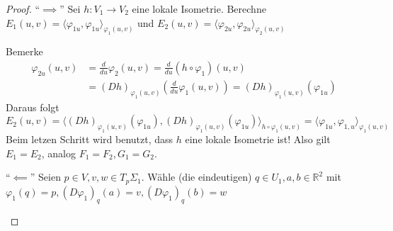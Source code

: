 \documentclass[../main.tex]{subfiles}
\begin{document}
\begin{proof}
    ``$\implies$'' Sei $h:V_1 \to V_2$ eine lokale Isometrie.
    Berechne $E_1(u,v)=\langle \varphi_{1u}, \varphi_{1u} \rangle _{\varphi_1(u,v)}$ und
    $E_2(u,v)=\langle \varphi_{2u}, \varphi_{2u} \rangle _{\varphi_2(u,v)}$

    Bemerke
    \begin{align*}
        \varphi_{2u}(u,v)&=\frac{d}{du}\varphi_2(u,v)=\frac{d}{du}(h \circ \varphi_1)(u,v) \\
        &=(Dh)_{\varphi_1(u,v)}\left(\frac{d}{du}\varphi_1(u,v)\right)=(Dh)_{\varphi_1(u,v)}(\varphi_{1u})
    \end{align*}
    Daraus folgt
    $$E_2(u,v)=\langle (Dh)_{\varphi_1(u,v)}(\varphi_{1u}), (Dh)_{\varphi_1(u,v)}(\varphi_{1u}) \rangle _{h \circ \varphi_1(u,v)}= \langle \varphi_{1u}, \varphi_{1,u}\rangle _{\varphi_1(u,v)}$$
    Beim letzen Schritt wird benutzt, dass $h$ eine lokale Isometrie ist! Also gilt $E_1=E_2$, analog $F_1=F_2, G_1=G_2$.

    \noindent``$\impliedby$'' Seien $p \in V, v,w \in T_p\Sigma_1$.
    Wähle (die eindeutigen) $q \in U_1, a,b \in \mathbb{R}^2$ mit 
    $\varphi_1 (q)=p, (D\varphi_1)_q(a)=v, (D\varphi_1)_q(b)=w$
    \begin{figure}[H]
        \centering
        \def\svgwidth{15em}
        
    \end{figure}


\end{proof}
\end{document}
